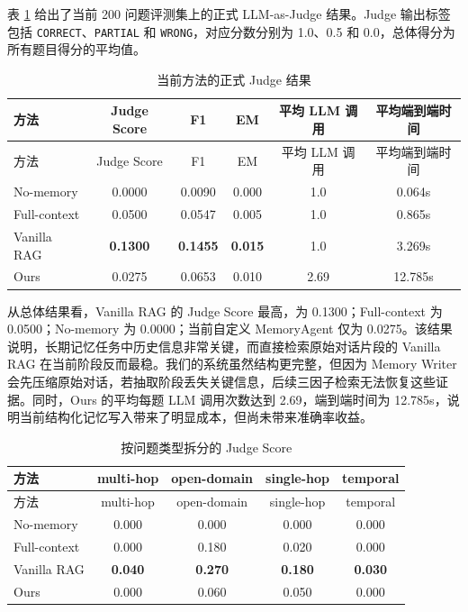 \documentclass[UTF8,a4paper,11pt]{ctexart}
\begin{document}
表 \ref{tab:judge-main} 给出了当前 200 问题评测集上的正式 LLM-as-Judge 结果。Judge 输出标签包括 \texttt{CORRECT}、\texttt{PARTIAL} 和 \texttt{WRONG}，对应分数分别为 1.0、0.5 和 0.0，总体得分为所有题目得分的平均值。

\begin{longtable}{lccccc}
\caption{当前方法的正式 Judge 结果}
\label{tab:judge-main}\\
\toprule
方法 & Judge Score & F1 & EM & 平均 LLM 调用 & 平均端到端时间 \\
\midrule
\endfirsthead
\toprule
方法 & Judge Score & F1 & EM & 平均 LLM 调用 & 平均端到端时间 \\
\midrule
\endhead
\midrule
\endfoot
\bottomrule
\endlastfoot
No-memory & 0.0000 & 0.0090 & 0.000 & 1.0 & 0.064s \\
Full-context & 0.0500 & 0.0547 & 0.005 & 1.0 & 0.865s \\
Vanilla RAG & \textbf{0.1300} & \textbf{0.1455} & \textbf{0.015} & 1.0 & 3.269s \\
Ours & 0.0275 & 0.0653 & 0.010 & 2.69 & 12.785s \\
\end{longtable}

从总体结果看，Vanilla RAG 的 Judge Score 最高，为 0.1300；Full-context 为 0.0500；No-memory 为 0.0000；当前自定义 MemoryAgent 仅为 0.0275。该结果说明，长期记忆任务中历史信息非常关键，而直接检索原始对话片段的 Vanilla RAG 在当前阶段反而最稳。我们的系统虽然结构更完整，但因为 Memory Writer 会先压缩原始对话，若抽取阶段丢失关键信息，后续三因子检索无法恢复这些证据。同时，Ours 的平均每题 LLM 调用次数达到 2.69，端到端时间为 12.785s，说明当前结构化记忆写入带来了明显成本，但尚未带来准确率收益。

\begin{longtable}{lcccc}
\caption{按问题类型拆分的 Judge Score}
\label{tab:judge-category}\\
\toprule
方法 & multi-hop & open-domain & single-hop & temporal \\
\midrule
\endfirsthead
\toprule
方法 & multi-hop & open-domain & single-hop & temporal \\
\midrule
\endhead
\midrule
\endfoot
\bottomrule
\endlastfoot
No-memory & 0.000 & 0.000 & 0.000 & 0.000 \\
Full-context & 0.000 & 0.180 & 0.020 & 0.000 \\
Vanilla RAG & \textbf{0.040} & \textbf{0.270} & \textbf{0.180} & \textbf{0.030} \\
Ours & 0.000 & 0.060 & 0.050 & 0.000 \\
\end{longtable}
\end{document}
